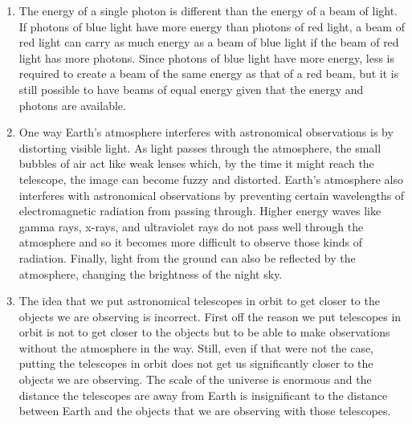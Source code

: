 \documentclass[../hw1.tex]{subfiles}
\begin{document}
    \begin{enumerate}
        \item The energy of a single photon is different than the energy of a beam of light. If photons of blue light have more energy than photons of red light, a beam of red light can carry as much energy as a beam of blue light if the beam of red light has more photons. Since photons of blue light have more energy, less is required to create a beam of the same energy as that of a red beam, but it is still possible to have beams of equal energy given that the energy and photons are available.
        \item One way Earth’s atmosphere interferes with astronomical observations is by distorting visible light. As light passes through the atmosphere, the small bubbles of air act like weak lenses which, by the time it might reach the telescope, the image can become fuzzy and distorted. Earth’s atmosphere also interferes with astronomical observations by preventing certain wavelengths of electromagnetic radiation from passing through. Higher energy waves like gamma rays, x-rays, and ultraviolet rays do not pass well through the atmosphere and so it becomes more difficult to observe those kinds of radiation. Finally, light from the ground can also be reflected by the atmosphere, changing the brightness of the night sky.
        \item The idea that we put astronomical telescopes in orbit to get closer to the objects we are observing is incorrect. First off the reason we put telescopes in orbit is not to get closer to the objects but to be able to make observations without the atmosphere in the way. Still, even if that were not the case, putting the telescopes in orbit does not get us significantly closer to the objects we are observing. The scale of the universe is enormous and the distance the telescopes are away from Earth is insignificant to the distance between Earth and the objects that we are observing with those telescopes.
    \end{enumerate}
\end{document}
